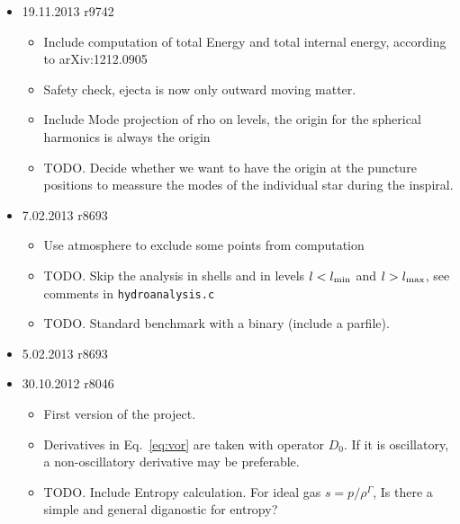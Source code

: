 \documentclass[a4paper,10pt]{article}
\begin{document}
\begin{itemize}


\item 19.11.2013 r9742
    \begin{itemize}
  \item Include computation of total Energy and total internal energy, according to arXiv:1212.0905
  \item Safety check, ejecta is now only outward moving matter.
  \item Include Mode projection of rho on levels, the origin for the spherical harmonics is always the origin
  \item TODO. Decide whether we want to have the origin at the puncture positions to meassure the modes of the individual star during the inspiral.
  \end{itemize}

\item 7.02.2013 r8693
  \begin{itemize}
  \item Use atmosphere to exclude some points from computation 
  \item TODO. Skip the analysis in shells and in levels $l<l_{\rm min}$ and $l>l_{\rm max}$, see comments in \verb#hydroanalysis.c#   
  \item TODO. Standard benchmark with a binary (include a parfile).
  \end{itemize}

\item 5.02.2013 r8693

\item 30.10.2012 r8046
  \begin{itemize}
  \item First version of the project.
  \item Derivatives in Eq.~\eqref{eq:vor} are taken with operator
    $D_0$. If it is oscillatory, a non-oscillatory derivative may be
    preferable. 
  \item TODO. Include Entropy calculation. 
    For ideal gas $s=p/\rho^\Gamma$, Is there a
    simple and general diganostic for entropy?
  \end{itemize}

\end{itemize}






\end{document}
